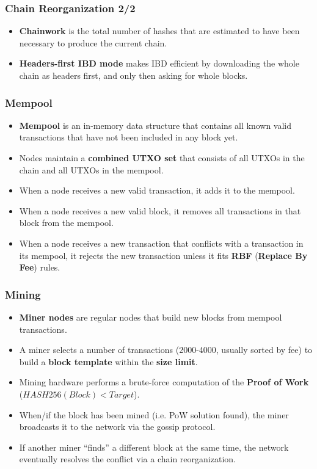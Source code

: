 \documentclass{beamer}
\begin{document}
\begin{frame}
  \frametitle{Chain Reorganization 2/2}
  \begin{itemize}
  \item \textbf{Chainwork} is the total number of hashes that are estimated to
    have been necessary to produce the current chain.
  \item \textbf{Headers-first IBD mode} makes IBD efficient by downloading the
    whole chain as headers first, and only then asking for whole blocks.
  \end{itemize}
\end{frame}

\begin{frame}
  \frametitle{Mempool}
  \begin{itemize}
  \item \textbf{Mempool} is an in-memory data structure that contains all known
    valid transactions that have not been included in any block yet.
  \item Nodes maintain a \textbf{combined UTXO set} that consists of all UTXOs
    in the chain and all UTXOs in the mempool.
  \item When a node receives a new valid transaction, it adds it to the mempool.
  \item When a node receives a new valid block, it removes all transactions in
    that block from the mempool.
  \item When a node receives a new transaction that conflicts with a transaction
    in its mempool, it rejects the new transaction unless it fits \textbf{RBF}
    (\textbf{Replace By Fee}) rules.
  \end{itemize}
\end{frame}

\begin{frame}
  \frametitle{Mining}
  \begin{itemize}
  \item \textbf{Miner nodes} are regular nodes that build new blocks from
    mempool transactions.
  \item A miner selects a number of transactions (2000-4000, usually sorted by
    fee) to build a \textbf{block template} within the \textbf{size limit}.
  \item Mining hardware performs a brute-force computation of the \textbf{Proof
      of Work} ($HASH256(Block) < Target$).
  \item When/if the block has been mined (i.e. PoW solution found), the miner
    broadcasts it to the network via the gossip protocol.
  \item If another miner ``finds'' a different block at the same time, the
    network eventually resolves the conflict via a chain reorganization.
  \end{itemize}
\end{frame}
\end{document}
